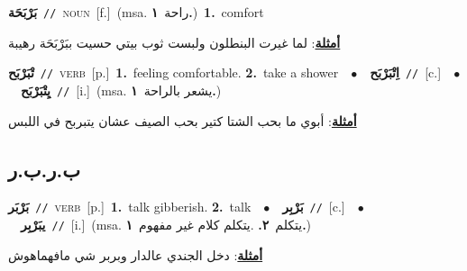\documentclass[10pt,a4paper,twoside]{article} %
\begin{document}
\begin{multicols}{2}
{\setlength\topsep{0pt}\textbf{\foreignlanguage{arabic}{بَرْبَحَة}}\ {\color{gray}\texttt{//}\color{black}}\ \textsc{noun}\ [f.]\ \color{gray}(msa. \foreignlanguage{arabic}{راحة}~\foreignlanguage{arabic}{\textbf{١.}})\color{black}\ \textbf{1.}~comfort\  \begin{flushright}\color{gray}\foreignlanguage{arabic}{\textbf{\underline{\foreignlanguage{arabic}{أمثلة}}}: لما غيرت البنطلون ولبست ثوب بيتي حسيت ببَرْبَحَة رهيبة}\end{flushright}\color{black}} \vspace{2mm}

{\setlength\topsep{0pt}\textbf{\foreignlanguage{arabic}{تْبَرْبَح}}\ {\color{gray}\texttt{//}\color{black}}\ \textsc{verb}\ [p.]\ \textbf{1.}~feeling comfortable.  \textbf{2.}~take a shower\ \ $\bullet$\ \ \setlength\topsep{0pt}\textbf{\foreignlanguage{arabic}{اِتْبَرْبَح}}\ {\color{gray}\texttt{//}\color{black}}\ [c.]\ \ $\bullet$\ \ \setlength\topsep{0pt}\textbf{\foreignlanguage{arabic}{يِتْبَرْبَح}}\ {\color{gray}\texttt{//}\color{black}}\ [i.]\ \color{gray}(msa. \foreignlanguage{arabic}{يشعر بالراحة}~\foreignlanguage{arabic}{\textbf{١.}})\color{black}\  \begin{flushright}\color{gray}\foreignlanguage{arabic}{\textbf{\underline{\foreignlanguage{arabic}{أمثلة}}}: أبوي ما بحب الشتا كتير بحب الصيف عشان يتبربح في اللبس}\end{flushright}\color{black}} \vspace{2mm}

\vspace{-3mm}
\subsection*{\color{blue}\foreignlanguage{arabic}{ب.ر.ب.ر}\color{blue}{}} 

{\setlength\topsep{0pt}\textbf{\foreignlanguage{arabic}{بَرْبَر}}\ {\color{gray}\texttt{//}\color{black}}\ \textsc{verb}\ [p.]\ \textbf{1.}~talk gibberish.  \textbf{2.}~talk\ \ $\bullet$\ \ \setlength\topsep{0pt}\textbf{\foreignlanguage{arabic}{بَرْبِر}}\ {\color{gray}\texttt{//}\color{black}}\ [c.]\ \ $\bullet$\ \ \setlength\topsep{0pt}\textbf{\foreignlanguage{arabic}{يبَرْبِر}}\ {\color{gray}\texttt{//}\color{black}}\ [i.]\ \color{gray}(msa. \foreignlanguage{arabic}{يتكلم}~\foreignlanguage{arabic}{\textbf{٢.}}  .\foreignlanguage{arabic}{يتكلم كلام غير مفهوم}~\foreignlanguage{arabic}{\textbf{١.}})\color{black}\  \begin{flushright}\color{gray}\foreignlanguage{arabic}{\textbf{\underline{\foreignlanguage{arabic}{أمثلة}}}: دخل الجندي عالدار وبربر شي مافهماهوش}\end{flushright}\color{black}} \vspace{2mm}


\end{multicols}
\end{document}
